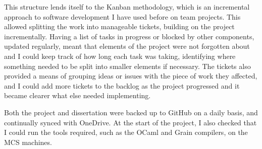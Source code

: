 This structure lends itself to the Kanban methodology, which is an incremental approach to software development I have used before on team projects. This allowed splitting the work into manageable tickets, building on the project incrementally. Having a list of tasks in progress or blocked by other components, updated regularly, meant that elements of the project were not forgotten about and I could keep track of how long each task was taking, identifying where something needed to be split into smaller elements if necessary. The tickets also provided a means of grouping ideas or issues with the piece of work they affected, and I could add more tickets to the backlog as the project progressed and it became clearer what else needed implementing.

Both the project and dissertation were backed up to GitHub on a daily basis, and continually synced with OneDrive. At the start of the project, I also checked that I could run the tools required, such as the OCaml and Grain compilers, on the MCS machines. 




